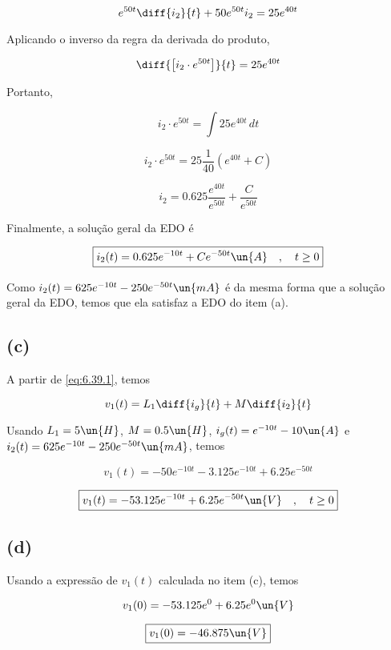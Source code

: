 \[ e^{50t}\diff{i_2}{t} + 50e^{50t}i_2 =  25e^{40t} \]

Aplicando o inverso da regra da derivada do produto,

\[ \diff{\left[i_2 \cdot e^{50t}\right]}{t} = 25e^{40t} \]

Portanto,

\[ i_2 \cdot e^{50t} = \int 25e^{40t} \, dt \]

\[ i_2 \cdot e^{50t} = 25 \frac{1}{40} (e^{40t} + C) \]

\[ i_2 = 0.625 \frac{e^{40t}}{e^{50t}} + \frac{C}{e^{50t}} \]

Finalmente, a solução geral da EDO é

\[ \boxed{i_2(t) = 0.625e^{-10t} + Ce^{-50t} \un{A} \quad , \quad t \geq 0}  \]

Como $i_2(t) = 625e^{-10t} - 250e^{-50t} \un{mA}$ é da mesma forma que a solução geral da EDO, temos que ela satisfaz a
EDO do item (a).

\subsection*{(c)}

A partir de \eqref{eq:6.39.1}, temos

\[ v_1(t) = L_1\diff{i_g}{t} + M\diff{i_2}{t} \]

Usando $L_1 = 5\un{H}$, $M = 0.5 \un{H}$, $i_g(t) = e^{-10t} - 10 \un{A}$ e $i_2(t) = 625e^{-10t} - 250e^{-50t} \un{mA}$, temos

\[ v_1(t) = -50e^{-10t} -3.125e^{-10t} + 6.25e^{-50t} \]

\[ \boxed{v_1(t) = -53.125e^{-10t} + 6.25e^{-50t} \un{V} \quad , \quad t \geq 0}  \]

\subsection*{(d)}

Usando a expressão de $v_1(t)$ calculada no item (c), temos

\[ v_1(0) = -53.125e^{0} + 6.25e^{0} \un{V} \]

\[ \boxed{v_1(0) = -46.875 \un{V}}  \]






